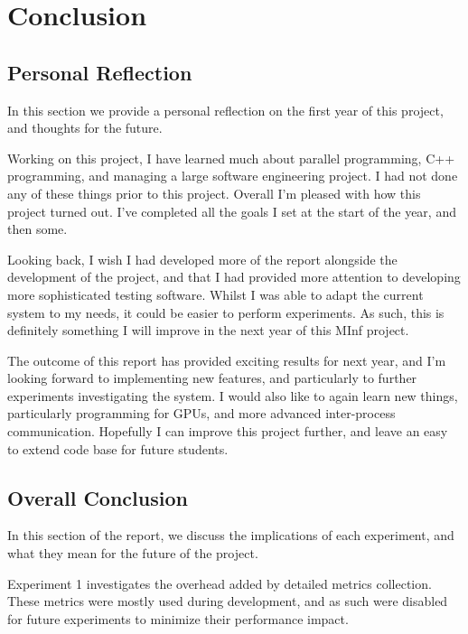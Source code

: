



\section{Conclusion}



\subsection{Personal Reflection}

In this section we provide a personal reflection on the first year of this project, and thoughts for the future.

Working on this project, I have learned much about parallel programming, C++ programming, and managing a large software engineering project. I had not done any of these things prior to this project. Overall I'm pleased with how this project turned out. I've completed all the goals I set at the start of the year, and then some.

Looking back, I wish I had developed more of the report alongside the development of the project, and that I had provided more attention to developing more sophisticated testing software. Whilst I was able to adapt the current system to my needs, it could be easier to perform experiments. As such, this is definitely something I will improve in the next year of this MInf project.

The outcome of this report has provided exciting results for next year, and I'm looking forward to implementing new features, and particularly to further experiments investigating the system. I would also like to again learn new things, particularly programming for GPUs, and more advanced inter-process communication. Hopefully I can improve this project further, and leave an easy to extend code base for future students.



\subsection{Overall Conclusion}

In this section of the report, we discuss the implications of each experiment, and what they mean for the future of the project. 

Experiment 1 investigates the overhead added by detailed metrics collection. These metrics were mostly used during development, and as such were disabled for future experiments to minimize their performance impact. 

